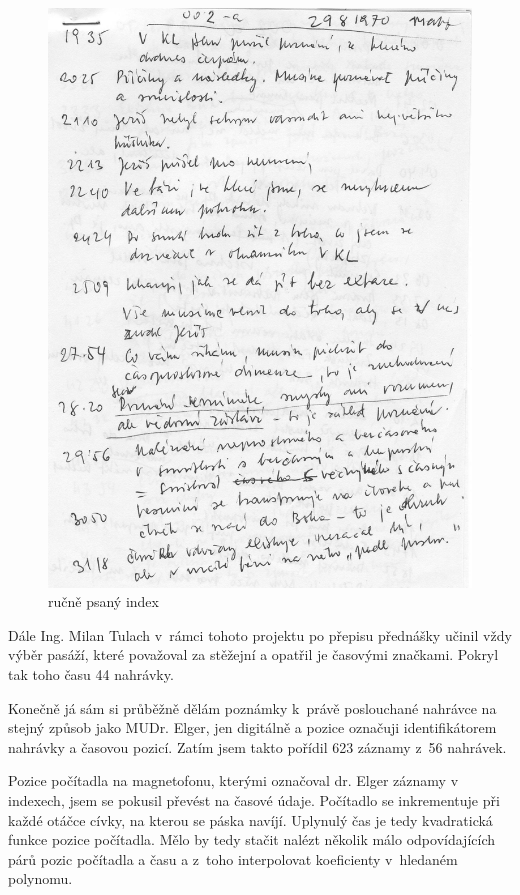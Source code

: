 \begin{figure}[htpb]
\includegraphics[scale=1.0]{rc/index-rucni.jpg}
\caption{ručně psaný index}
\label{fig:index-rucni}
\end{figure}

Dále Ing. Milan Tulach v~rámci tohoto projektu po přepisu přednášky učinil vždy
výběr pasáží, které považoval za stěžejní a opatřil je časovými značkami. Pokryl
tak toho času 44 nahrávky.

Konečně já sám si průběžně dělám poznámky k~právě poslouchané nahrávce na stejný
způsob jako MUDr. Elger, jen digitálně a pozice označuji identifikátorem
nahrávky a časovou pozicí. Zatím jsem takto pořídil 623 záznamy z~56 nahrávek.

Pozice počítadla na magnetofonu, kterými označoval dr. Elger záznamy v indexech,
jsem se pokusil převést na časové údaje. Počítadlo se inkrementuje při každé
otáčce cívky, na kterou se páska navíjí. Uplynulý čas je tedy kvadratická funkce
pozice počítadla. Mělo by tedy stačit nalézt několik málo odpovídajících párů
pozic počítadla a času a z~toho interpolovat koeficienty v~hledaném polynomu.

